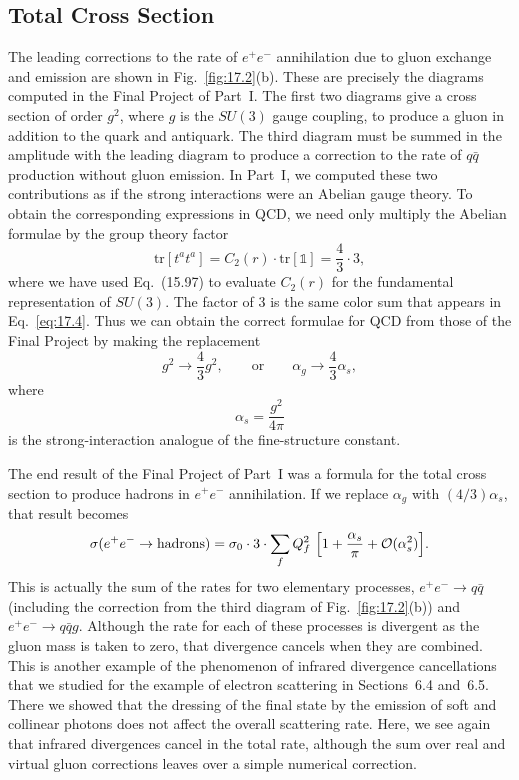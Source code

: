 \subsection{Total Cross Section}

The leading corrections to the rate of $e^{+}e^{-}$ annihilation due to gluon
exchange and emission are shown in Fig.~\ref{fig:17.2}(b).  These are
precisely the diagrams computed in the Final Project of Part~I.  The first
two diagrams give a cross section of order $g^2$, where $g$ is the $SU(3)$
gauge coupling, to produce a gluon in addition to the quark and antiquark.
The third diagram must be summed in the amplitude with the leading diagram
to produce a correction to the rate of $q\bar{q}$ production without gluon
emission.  In Part~I, we computed these two contributions as if the strong
interactions were an Abelian gauge theory.  To obtain the corresponding
expressions in QCD, we need only multiply the Abelian formulae by the group
theory factor
\begin{equation}
  \mathrm{tr}[t^at^a] = C_2(r)\cdot\mathrm{tr}[\mathbb{1}]
  = \frac{4}{3}\cdot 3 ,
  \label{eq:17.6}
\end{equation}
where we have used Eq.~(15.97) to evaluate $C_2(r)$ for the
fundamental representation of $SU(3)$.  The factor of 3 is the same color sum
that appears in Eq.~\eqref{eq:17.4}.  Thus we can obtain the correct formulae
for QCD from those of the Final Project by making the replacement
\begin{equation}
  g^2 \to \frac{4}{3}g^2,\qquad \text{or}\qquad
  \alpha_g \to \frac{4}{3}\alpha_s ,
  \label{eq:17.7}
\end{equation}
where
\begin{equation}
  \alpha_s = \frac{g^2}{4\pi}
  \label{eq:17.8}
\end{equation}
is the strong-interaction analogue of the fine-structure constant.

The end result of the Final Project of Part~I was a formula for the total
cross section to produce hadrons in $e^{+}e^{-}$ annihilation.  If we replace
$\alpha_g$ with $(4/3)\alpha_s$, that result becomes
\begin{equation}
  \sigma(e^{+}e^{-}\to\text{hadrons}) = \sigma_0\cdot 3\cdot
    \sum_f Q_f^2\ \Bigl[ 1 + \frac{\alpha_s}{\pi} + \mathcal{O}(\alpha_s^2)
      \Bigr] .
  \label{eq:17.9}
\end{equation}
This is actually the sum of the rates for two elementary processes,
$e^{+}e^{-}\to q\bar{q}$ (including the correction from the third diagram of
Fig.~\ref{fig:17.2}(b)) and $e^{+}e^{-}\to q\bar{q}g$.  Although the rate for
each of these processes is divergent as the gluon mass is taken to zero, that
divergence cancels when they are combined.  This is another example of the
phenomenon of infrared divergence cancellations that we studied for the
example of electron scattering in Sections~6.4 and~6.5.  There we showed
that the dressing of the final state by the emission of soft and collinear
photons does not affect the overall scattering rate.  Here, we see again that
infrared divergences cancel in the total rate, although the sum over real and
virtual gluon corrections leaves over a simple numerical correction.

